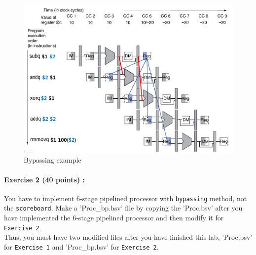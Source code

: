 \documentclass{article}
\begin{document}
\begin{figure}[htbp]
	\begin{center}
		\includegraphics[scale=0.4]{forwarding.png}
		\caption{Bypassing example}
		\label{fig:2pipe_proc}
	\end{center}
\end{figure}

\noindent \paragraph{\bf Exercise 2 (40 points) :} 
You have to implement 6-stage pipelined processor with \texttt{bypassing} method, not the \texttt{scoreboard}.
Make a 'Proc\_bp.bsv' file by copying the 'Proc.bsv' after you have implemented the 6-stage pipelined processor 
and then modify it for \texttt{Exercise 2}.
\\Thus, you must have two modified files after you have finished this lab, 'Proc.bsv' for \texttt{Exercise 1} 
and 'Proc\_bp.bsv' for \texttt{Exercise 2}.
\end{document}
